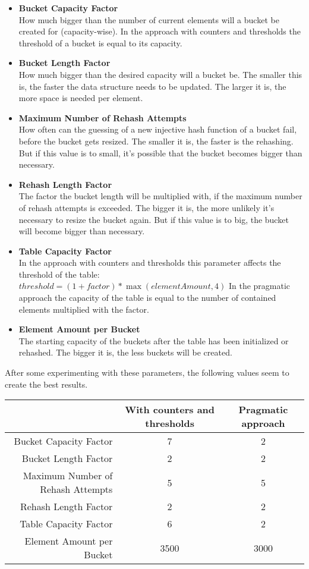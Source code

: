 \documentclass{article}
\begin{document}
\begin{itemize}
  \item \textbf{Bucket Capacity Factor}\\
  	How much bigger than the number of current elements will a bucket be created for (capacity-wise). In the approach with counters and thresholds the threshold of a bucket is equal to its capacity.
  \item \textbf{Bucket Length Factor}\\
    How much bigger than the desired capacity will a bucket be. The smaller this is, the faster the data structure needs to be updated. The larger it is, the more space is needed per element.
  \item \textbf{Maximum Number of Rehash Attempts}\\
  	How often can the guessing of a new injective hash function of a bucket fail, before the bucket gets resized. The smaller it is, the faster is the rehashing. But if this value is to small, it's possible that the bucket becomes bigger than necessary.
  \item \textbf{Rehash Length Factor}\\
    The factor the bucket length will be multiplied with, if the maximum number of rehash attempts is exceeded. The bigger it is, the more unlikely it's necessary to resize the bucket again. But if this value is to big, the bucket will become bigger than necessary.
  \item \textbf{Table Capacity Factor}\\
    In the approach with counters and thresholds this parameter affects the threshold of the table: $ threshold = (1 + factor) * \max(elementAmount, 4) $
    In the pragmatic approach the capacity of the table is equal to the number of contained elements multiplied with the factor.
  \item \textbf{Element Amount per Bucket}\\
    The starting capacity of the buckets after the table has been initialized or rehashed. The bigger it is, the less buckets will be created.
\end{itemize}

After some experimenting with these parameters, the following values seem to create the best results.

\begin{center}
\begin{tabulary}{0.95\textwidth}{R|C|C}
& With counters \newline and thresholds & Pragmatic approach \\ 
\hline Bucket Capacity Factor & 7 & 2 \\ 
\hline Bucket Length Factor & 2 & 2 \\ 
\hline Maximum Number of Rehash Attempts & 5 & 5 \\ 
\hline Rehash Length Factor & 2 & 2 \\ 
\hline Table Capacity Factor & 6 & 2 \\ 
\hline Element Amount per Bucket & 3500 & 3000 \\
\end{tabulary}
\end{center}
\end{document}
